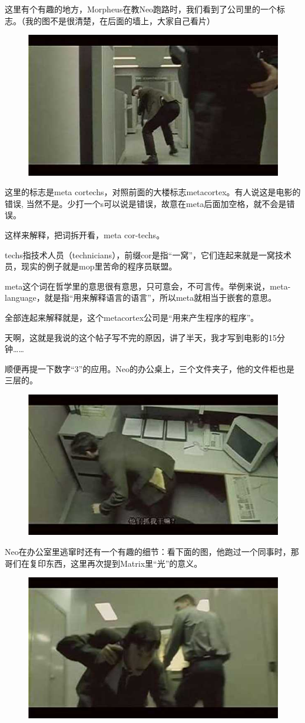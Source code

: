 \documentclass{ctexart}
\begin{document}
这里有个有趣的地方，Morpheus在教Neo跑路时，我们看到了公司里的一个标志。（我的图不是很清楚，在后面的墙上，大家自己看片）

\begin{figure}[htb]
\centering
\includegraphics[width=0.5\linewidth]{fig/read_Matrix-9}
\end{figure}

这里的标志是meta cortechs，对照前面的大楼标志metacortex。有人说这是电影的错误, 当然不是。少打一个s可以说是错误，故意在meta后面加空格，就不会是错误。

这样来解释，把词拆开看，meta cor-techs。

techs指技术人员（technicians），前缀cor是指“一窝”，它们连起来就是一窝技术员，现实的例子就是mop里苦命的程序员联盟。

meta这个词在哲学里的意思很有意思，只可意会，不可言传。举例来说，meta-language，就是指“用来解释语言的语言”，所以meta就相当于嵌套的意思。

全部连起来解释就是，这个metacortex公司是“用来产生程序的程序”。

天啊，这就是我说的这个帖子写不完的原因，讲了半天，我才写到电影的15分钟……

顺便再提一下数字“3”的应用。Neo的办公桌上，三个文件夹子，他的文件柜也是三层的。

\begin{figure}[htb]
\centering
\includegraphics[width=0.5\linewidth]{fig/read_Matrix-10}
\end{figure}

Neo在办公室里逃窜时还有一个有趣的细节：看下面的图，他跑过一个同事时，那哥们在复印东西，这里再次提到Matrix里“光”的意义。

\begin{figure}[htb]
\centering
\includegraphics[width=0.5\linewidth]{fig/read_Matrix-11}
\end{figure}
\end{document}
